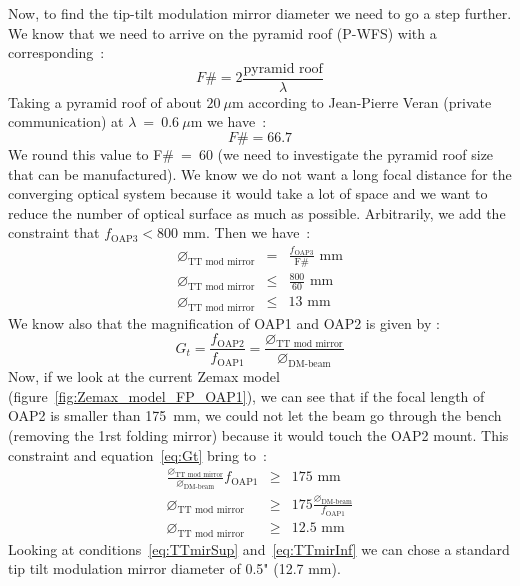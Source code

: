 \documentclass[12pt,a4paper]{article}
\begin{document}
Now, to find the tip-tilt modulation mirror diameter we need to go a step further. We know that we need to arrive on the pyramid roof (P-WFS) with a corresponding~:
\begin{equation}
	 F\#=2\frac{\text{pyramid roof}}{\lambda}\label{eq:FnumEq}
\end{equation}
Taking a pyramid roof of about $20~\mu$m according to Jean-Pierre Veran (private communication) at $\lambda~=~0.6~\mu$m we have~:
\begin{equation}
	F\# = 66.7\label{eq:Fnum}
\end{equation}
We round this value to F\#~=~60 (we need to investigate the pyramid roof size that can be manufactured). We know we do not want a long focal distance for the converging optical system because it would take a lot of space and we want to reduce the number of optical surface as much as possible. Arbitrarily, we add the constraint that $f_\text{OAP3} < 800$ mm. Then we have~:
\begin{eqnarray}
	\diameter_\text{TT mod mirror} &= &\frac{f_\text{OAP3}}{\text{F}\#} \text{ mm} \nonumber\\
	\diameter_\text{TT mod mirror} &\leq &\frac{800}{60}\text{ mm} \nonumber\\
	\diameter_\text{TT mod mirror} &\leq &13\text{ mm} \label{eq:TTmirSup}
\end{eqnarray}
We know also that the magnification of OAP1 and OAP2 is given by :
\begin{equation}
	G_t = \frac{f_\text{OAP2}}{f_\text{OAP1}} = \frac{\diameter_\text{TT mod mirror}}{\diameter_\text{DM-beam}}\label{eq:Gt}
\end{equation}
Now, if we look at the current Zemax model (figure~\ref{fig:Zemax_model_FP_OAP1}), we can see that if the focal length of OAP2 is smaller than 175~mm, we could not let the beam go through the bench (removing the 1rst folding mirror) because it would touch the OAP2 mount. This constraint and equation~\eqref{eq:Gt} bring to~:
\begin{eqnarray}
		\frac{\diameter_\text{TT mod mirror}}{\diameter_\text{DM-beam}}f_\text{OAP1} &\geq &175\text{ mm} \nonumber\\
		\diameter_\text{TT mod mirror} &\geq & 175\frac{\diameter_\text{DM-beam}}{f_\text{OAP1}} \nonumber\\
		\diameter_\text{TT mod mirror} &\geq &12.5\text{ mm}\label{eq:TTmirInf}
\end{eqnarray}
Looking at conditions~\eqref{eq:TTmirSup} and~\eqref{eq:TTmirInf} we can chose a standard tip tilt modulation mirror diameter of 0.5" (12.7 mm).\\
\end{document}

